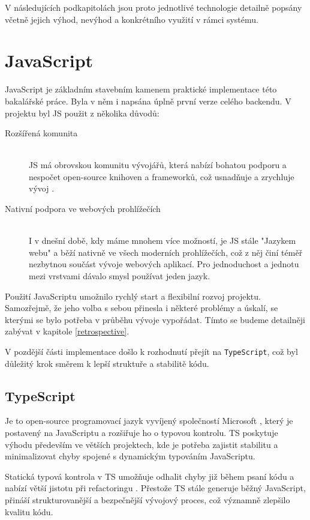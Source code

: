 V následujících podkapitolách jsou proto jednotlivé technologie detailně popsány včetně jejich výhod, nevýhod a konkrétního využití v rámci systému.

\section{JavaScript}
JavaScript je základním stavebním kamenem praktické implementace této bakalářské práce. Byla v něm i napsána úplně první verze celého backendu. V projektu byl JS použit z několika důvodů:

\begin{description}
  \item[Rozšířená komunita] \hfill \\ JS má obrovskou komunitu vývojářů, která nabízí bohatou podporu a nespočet open-source knihoven a frameworků, což usnadňuje a zrychluje vývoj \cite{dev52MDevelopers}.
  \item[Nativní podpora ve webových prohlížečích] \hfill \\ I v dnešní době, kdy máme mnohem více možností, je JS stále "Jazykem webu"\cite{ranjan2020javascript} a běží nativně ve všech moderních prohlížečích\cite{browserstackJavaScriptCode}, což z něj činí téměř nezbytnou součást vývoje webových aplikací. Pro jednoduchost a jednotu mezi vrstvami dávalo smysl používat jeden jazyk.
\end{description}

Použití JavaScriptu umožnilo rychlý start a flexibilní rozvoj projektu. Samozřejmě, že jeho volba s sebou přinesla i některé problémy a úskalí, se kterými se bylo potřeba v průběhu vývoje vypořádat. Tímto se budeme detailněji zabývat v kapitole \ref{retrospective}.

V pozdější části implementace došlo k rozhodnutí přejít na \texttt{TypeScript}, což byl důležitý krok směrem k lepší struktuře a stabilitě kódu.

\subsection{TypeScript}
Je to open-source programovací jazyk vyvíjený společností Microsoft \cite{typescriptlangDocumentationTypeScript}, který je postavený na JavaScriptu a rozšiřuje ho o typovou kontrolu\cite{goldberg2022learning}. TS poskytuje výhodu především ve větších projektech, kde je potřeba zajistit stabilitu a minimalizovat chyby spojené s dynamickým typováním JavaScriptu.

Statická typová kontrola v TS umožňuje odhalit chyby již během psaní kódu a nabízí větší jistotu při refactoringu \cite{enwiki:1258410189, sethi1996programming}. Přestože TS stále generuje běžný JavaScript, přináší strukturovanější a bezpečnější vývojový proces, což významně zlepšilo kvalitu kódu.

